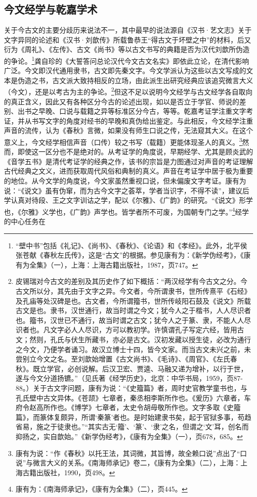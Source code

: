 \documentclass[a4paper, 12pt, openright]{ctexbook}
\begin{document}
\subsection{今文经学与乾嘉学术}

关于今古文的主要分歧历来说法不一，其中最早的说法源自《汉书·艺文志》关于文字异同的论述和《汉书·刘歆传》所载鲁恭王“得古文于坏壁之中”的材料，后又衍为《周礼》、《左传》、古文《尚书》等以古文书写的典籍是否为汉代刘歆所伪造的争论。\footnote{“壁中书”包括《礼记》、《尚书》、《春秋》、《论语》和《孝经》。此外，北平侯张苍献《春秋左氏传》，这是“古文”的根据。参见康有为：《新学伪经考》，《康有为全集》（一），上海：上海古籍出版社，1987，页747。}龚自珍的《大誓答问总论汉代今文古文名实》即依此立论，在清代影响广泛。今文即汉代通用隶书，古文即先秦文字。今文学派认为这些以古文写成的文本是伪造之书，古文派大致持相反的立场，由此派生出研究经典应该追究微言大义（今文），还是以考古为主的争论。\footnote{皮锡瑞对今古文的差别及其历史作了如下概括：“两汉经学有今古文之分。今古文所以分，其先由于文字之异。今文者，今所谓隶书，世所传熹平《石经》及孔庙等处汉碑是也。古文者，今所谓籀书，世所传岐阳石鼓及《说文》所载古文是也。隶书，汉世通行，故当时谓之今文；犹今人之于楷书，人人尽识者也。籀书，汉世已不通行，故当时谓之古文；犹今人之于篆、隶，不能人人尽识者也。凡文字必人人尽识，方可以教初学。许慎谓孔子写定六经，皆用古文；然则，孔氏与伏生所藏书，亦必是古文。汉初发藏以授生徒，必改为通行之今文，乃便学者诵习。故汉立博士十四，皆今文家。而当古文未兴之前，未尝别立今文之名。至刘歆始增置《古文尚书》、《毛诗》、《周官》、《左氏春秋》。既立学官，必创说解。后汉卫宏、贾逵、马融又递为增补，以行于世，遂与今文分道扬镳。”（见氏著《经学历史》，北京：中华书局，1959，页87-88。）关于古文字问题，康有为说：“《史籀篇》者，周时史官教学童书也，与孔氏壁中古文异体。《苍颉》七章者，秦丞相李斯所作也。《爰历》六章者，车府令赵高所作也。《博学》七章者，太史令胡毋敬所作也。文字多取《史籀篇》，而篆体复颇异，所谓‘秦篆’者也。是时始建隶书矣，起于官狱多事，苟趋省易，施之于徒隶也。”“其实古无‘籀’、‘篆’、‘隶’之名，但谓之‘文’耳，创名而抑扬之，实自歆始。”《新学伪经考》，《康有为全集》（一），页678，685。}但这不足以说明今文经学与古文经学各自取向的真正含义，因此又有各种区分今古的论述出现，如以是否立于学官、师说的差别、出书之早晚、口说与载籍之异等标准区分今古，等等。乾嘉考证学注重文字考证，并从书写文字的角度对经书的早晚和真伪给出鉴定。与此相反，今文经学注重声音的流传，认为《春秋》言微，如果没有师生口说之传，无法窥其大义。在这个意义上，今文经学相信声音（口传）较之书写（载籍）更能体现圣人的真义。\footnote{康有为说：“作《春秋》以托王法，其词微，其旨博，故全赖口说”点出了“口说”与微言大义的关系。《南海师承记》卷二，《康有为全集》（二），上海：上海古籍出版社，1990，页498。}然而，即使这一区分也不是绝对的。从考证学的角度说，早期经学、尤其是顾炎武的《音学五书》是清代考证学的经典之作，该书的宗旨是力图通过对声音的考证理解古代经典之文义，进而获取周代风俗和典制的真义。声音在考证学中居于极为重要的地位。从今文学的角度说，今文家虽然重视口说，但未偏废文字考证。康有为说：“《说文》虽有伪窜，而为古今文字之荟萃，学者当识字，不得不读”，建议后学认真对待段、王之文字训诂之学，配以《尔雅》、《广韵》的研究。“《说文》形学也，《尔雅》义学也，《广韵》声学也。皆学者所不可废，为国朝专门之学。”\footnote{康有为：《南海师承记》，《康有为全集》（二），页445。}经学的中心任务在
\end{document}
